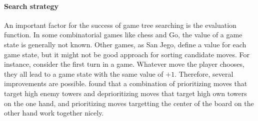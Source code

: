 \documentclass[sigconf]{acmart}
\newcommand{\bl}{\node [circle, minimum size=0.7cm, draw=black, fill=blue!65!white, thin]{};}
\newcommand{\wh}{\node [rectangle, minimum size=0.7cm, draw=black, fill=yellow] {};}
\begin{document}
\paragraph{Search strategy}
An important factor for the success of game tree searching is the evaluation function.
In some combinatorial games like chess and Go, the value of a game state is generally not known.
Other games, as San Jego, define a value for each game state, but it might not be good approach for sorting candidate moves.
For instance, consider the first turn in a game.
Whatever move the player chooses, they all lead to a game state with the same value of $+1$.
Therefore, several improvements are possible.
\citeauthor{Althöfer2020} found that a combination of prioritizing moves that target high enemy towers and deprioritizing moves that target high own towers on the one hand, and prioritizing moves targetting the center of the board on the other hand work together nicely.



\end{document}
